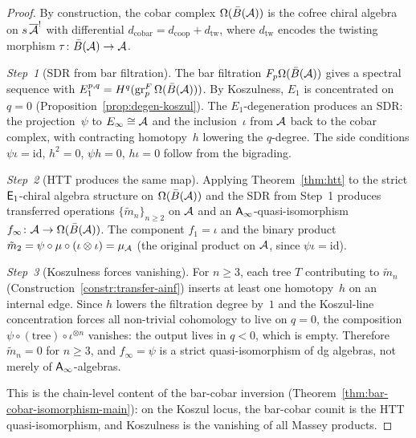 \begin{proof}
By construction, the cobar complex $\Omega(\bar{B}(\mathcal{A}))$ is the
cofree chiral algebra on $s\,\overline{\mathcal{A}}^!$ with differential
$d_{\mathrm{cobar}} = d_{\mathrm{coop}} + d_{\mathrm{tw}}$, where
$d_{\mathrm{tw}}$ encodes the twisting morphism
$\tau \colon \bar{B}(\mathcal{A}) \to \mathcal{A}$.

\emph{Step~1} (SDR from bar filtration).
The bar filtration $F_p\Omega(\bar{B}(\mathcal{A}))$ gives a spectral sequence
with $E_1^{p,q} = H^q(\mathrm{gr}_p^F\,\Omega(\bar{B}(\mathcal{A})))$.
By Koszulness, $E_1$ is concentrated on $q = 0$
(Proposition~\ref{prop:degen-koszul}).  The $E_1$-degeneration
produces an SDR: the projection~$\psi$ to
$E_\infty \cong \mathcal{A}$ and the inclusion~$\iota$ from $\mathcal{A}$ back to the
cobar complex, with contracting homotopy~$h$ lowering the $q$-degree.
The side conditions $\psi\iota = \mathrm{id}$, $h^2 = 0$, $\psi h = 0$,
$h\iota = 0$ follow from the bigrading.

\emph{Step~2} (HTT produces the same map).
Applying Theorem~\ref{thm:htt} to the strict $\mathsf{E}_1$-chiral algebra
structure on $\Omega(\bar{B}(\mathcal{A}))$ and the SDR from Step~1 produces
transferred operations $\{\tilde{m}_n\}_{n \geq 2}$ on $\mathcal{A}$
and an $\mathsf{A}_{\infty}$-quasi-isomorphism $f_\infty \colon \mathcal{A} \to
\Omega(\bar{B}(\mathcal{A}))$.  The component $f_1 = \iota$ and the
binary product $\tilde{m}_2 = \psi \circ \mu \circ
(\iota \otimes \iota) = \mu_{\mathcal{A}}$ (the original product on $\mathcal{A}$,
since $\psi\iota = \mathrm{id}$).

\emph{Step~3} (Koszulness forces vanishing).
For $n \geq 3$, each tree $T$ contributing to $\tilde{m}_n$
(Construction~\ref{constr:transfer-ainf}) inserts at least one
homotopy~$h$ on an internal edge.  Since $h$ lowers the filtration
degree by~$1$ and the Koszul-line concentration forces all
non-trivial cohomology to live on $q = 0$, the composition
$\psi \circ (\text{tree})\circ \iota^{\otimes n}$ vanishes: the
output lives in $q < 0$, which is empty.  Therefore
$\tilde{m}_n = 0$ for $n \geq 3$, and $f_\infty = \psi$ is a
strict quasi-isomorphism of dg algebras, not merely of $\mathsf{A}_{\infty}$-algebras.

This is the chain-level content of the bar-cobar inversion
(Theorem~\ref{thm:bar-cobar-isomorphism-main}): on the Koszul locus,
the bar-cobar counit is the HTT quasi-isomorphism, and Koszulness is
the vanishing of all Massey products.
\end{proof}


